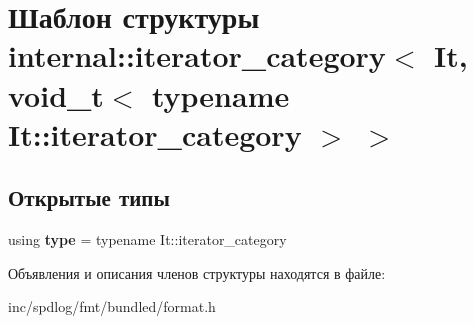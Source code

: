 \hypertarget{structinternal_1_1iterator__category_3_01It_00_01void__t_3_01typename_01It_1_1iterator__category_01_4_01_4}{}\section{Шаблон структуры internal\+:\+:iterator\+\_\+category$<$ It, void\+\_\+t$<$ typename It\+:\+:iterator\+\_\+category $>$ $>$}
\label{structinternal_1_1iterator__category_3_01It_00_01void__t_3_01typename_01It_1_1iterator__category_01_4_01_4}
\subsection*{Открытые типы}
\begin{DoxyCompactItemize}
\item 
\mbox{\label{structinternal_1_1iterator__category_3_01It_00_01void__t_3_01typename_01It_1_1iterator__category_01_4_01_4_a9e5df5e6c1a234602a3c51f6f1f48f07}} 
using {\bfseries type} = typename It\+::iterator\+\_\+category
\end{DoxyCompactItemize}


Объявления и описания членов структуры находятся в файле\+:\begin{DoxyCompactItemize}
\item 
inc/spdlog/fmt/bundled/format.\+h\end{DoxyCompactItemize}

